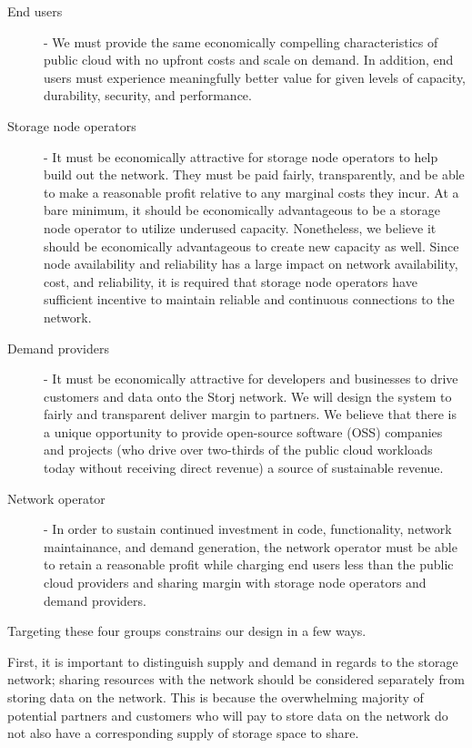 \documentclass[11pt,fleqn,openany]{book}
\begin{document}
\begin{description}
\item[End users] - We must provide the same economically compelling
  characteristics of public cloud with no upfront costs and scale on demand.
  In addition, end users must experience meaningfully better value for given
  levels of capacity, durability, security, and performance.

\item[Storage node operators] - It must be economically attractive for storage
  node operators to help build out the network.
  They must be paid fairly, transparently, and be able to make a
  reasonable profit relative to any marginal costs they incur.
  At a bare minimum, it should be economically advantageous to be a storage
  node operator to utilize underused capacity. Nonetheless, we believe it should be
  economically advantageous to create new capacity as well.
  Since node availability and reliability has a large impact on network
  availability, cost, and reliability, it is required that storage node
  operators have sufficient incentive to maintain reliable and continuous
  connections to the network.

\item[Demand providers] - It must be economically attractive for developers and
  businesses to drive customers and data onto the Storj network. We will design
  the system to fairly and transparent deliver margin to partners. We believe
  that there is a unique opportunity to provide open-source software (OSS)
  companies and projects (who drive over two-thirds of the public cloud workloads
  today without receiving direct revenue) a source of sustainable revenue.

\item[Network operator] - In order to sustain continued investment in code,
  functionality, network maintainance, and demand generation, the network
  operator must be able to retain a reasonable profit while charging
  end users less than the public cloud providers and sharing margin with storage
  node operators and demand providers.
\end{description}

Targeting these four groups constrains our design in a few ways.

First, it is important to distinguish supply and demand in regards to the
storage network; sharing resources with the network should be considered
separately from storing data on the network. This is because
the overwhelming majority of potential partners and customers who will
pay to store data on the
network do not also have a corresponding supply of storage space to share.
\end{document}
